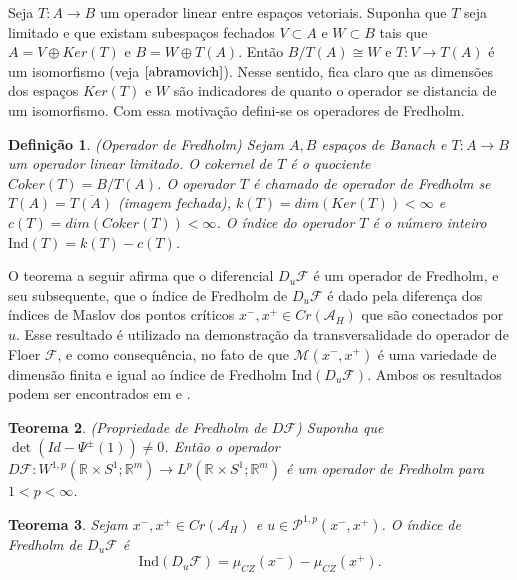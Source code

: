 \documentclass[12pt]{book}
\newtheorem{teorema}{Teorema}[section]
\newtheorem{definicao}[teorema]{Definição}
\newcommand{\caminhosexponenciaisconectantes}[2]{\mathcal{P}^{1,p}(#1, #2)}
\newcommand{\caminhosexponenciaisconectantespadrao}{\caminhosexponenciaisconectantes{x^{-}}{x^{+}}}
\newcommand{\circulo}{S^{1}}
\newcommand{\diferencialfloer}{D\operadorFloer}
\newcommand{\diferencialfloerponto}[1]{D_{#1}\operadorFloer}
\newcommand{\energiafinitaM}{\mathcal{M}}
\newcommand{\energiafinitaMconectante}{\energiafinitaM(x^{-}, x^{+})}
\newcommand{\espacoLpcontradominio}[2]{L^{p}(#1;#2)}
\newcommand{\espacosobolevcontradominio}[2]{W^{1,p}(#1;#2)}
\newcommand{\funcionalH}{\mathcal{A}_{H}}
\newcommand{\iconley}[1]{\iconleyabrev(#1)}
\newcommand{\iconleyabrev}{\mu_{CZ}}
\newcommand{\ind}{\text{Ind}}
\newcommand{\operadorFloer}{\mathcal{F}}
\newcommand{\pontoscriticos}[1]{\textit{Cr}(#1)}
\newcommand{\retacartesianocirculo}{\real{} \times \circulo}
\newcommand{\real}[1]{\mathbb{R}^{#1}}
\begin{document}
	Seja $T:A\to B$ um operador linear entre espaços vetoriais. Suponha que $T$ seja limitado e que existam subespaços fechados $V \subset A$ e $W \subset B$ tais que $A=V\oplus Ker(T)$ e $B=W\oplus T(A)$. Então $B/T(A) \cong W$ e $T:V \to T(A)$ é um isomorfismo (veja $\cite{abramovich}$). Nesse sentido, fica claro que as dimensões dos espaços $Ker(T)$ e $W$ são indicadores de quanto o operador se distancia de um isomorfismo. Com essa motivação defini-se os operadores de Fredholm.
	
	\begin{definicao}\label{definicao_operador_fredholm}
		(Operador de Fredholm) Sejam $A, B$ espaços de Banach e $T: A\to B$ um operador linear limitado. O cokernel de $T$ é o quociente $Coker(T)=B/T(A)$. O operador $T$ é chamado de operador de Fredholm se $T(A)=\overline{T(A)}$ (imagem fechada), $k(T) = dim(Ker(T)) < \infty$ e $c(T)=dim(Coker(T)) < \infty$. O índice do operador $T$ é o número inteiro $\ind(T) = k(T) - c(T)$. 
	\end{definicao}
	
	O teorema a seguir afirma que o diferencial $\diferencialfloerponto{u}$ é um operador de Fredholm, e seu subsequente, que o índice de Fredholm de $\diferencialfloerponto{u}$ é dado pela diferença dos índices de Maslov dos pontos críticos $x^{-}, x^{+} \in \pontoscriticos{\funcionalH}$ que são conectados por $u$. Esse resultado é utilizado na demonstração da transversalidade do operador de Floer $\operadorFloer$, e como consequência, no fato de que $\energiafinitaMconectante$ é uma variedade de dimensão finita e igual ao índice de Fredholm $\ind(\diferencialfloerponto{u})$. Ambos os resultados podem ser encontrados em \cite{audi_floer_homology} e \cite{salamon_zehnder}.
	
	\begin{teorema}
		(Propriedade de Fredholm de $\diferencialfloer$) Suponha que $\det(Id - \Psi^{\pm}(1)) \neq 0$. Então o operador $\diferencialfloer: \espacosobolevcontradominio{\retacartesianocirculo}{\real{m}}\to \espacoLpcontradominio{\retacartesianocirculo}{\real{m}}$ é um operador de Fredholm para $1<p<\infty$.
	\end{teorema}
	
	\begin{teorema}\label{teorema_indice_diferencial_operador_floer}
		Sejam $ x^{-}, x^{+} \in \pontoscriticos{\funcionalH}$ e $u\in \caminhosexponenciaisconectantespadrao$. O índice de Fredholm de $\diferencialfloerponto{u}$ é
		$$
		\ind(\diferencialfloerponto{u}) = \iconley{x^{-}}-\iconley{x^{+}}.
		$$
	\end{teorema}
	
\end{document}

